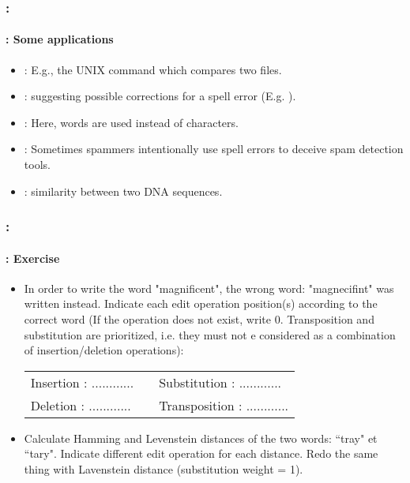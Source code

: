 \documentclass[xcolor=table]{beamer}
\begin{document}
\begin{frame}
	\frametitle{\insertshortsubtitle: \insertsection}
	\framesubtitle{\insertsubsection: Some applications}

	\begin{itemize}
		\item {}: E.g., the UNIX  command which compares two files.
		\item {}: suggesting possible corrections for a spell error (E.g. ).
		\item {}: Here, words are used instead of characters.
		\item {}: Sometimes spammers intentionally use spell errors to deceive spam detection tools.
		\item {}: similarity between two DNA sequences.
	\end{itemize}

\end{frame}

\begin{frame}
	\frametitle{\insertshortsubtitle: \insertsection}
	\framesubtitle{\insertsubsection: Exercise}
	
	\begin{itemize}
		\item In order to write the word "magnificent", the wrong word: "magnecifint" was written instead. Indicate each edit operation position(s) according to the correct word (If the operation does not exist, write 0. Transposition and substitution are prioritized, i.e. they must not e considered as a combination of insertion/deletion operations):
		\begin{tabular}{|lll|}
			\hline 
			Insertion : ............ & & Substitution  : ............ \\
			Deletion  : ............ & & Transposition : ............ \\
			\hline
		\end{tabular}
		
		\item Calculate Hamming and Levenstein distances of the two words: ``tray" et ``tary".
		Indicate different edit operation for each distance. Redo the same thing with Lavenstein distance (substitution weight = 1).
	\end{itemize}
	
\end{frame}
\end{document}
